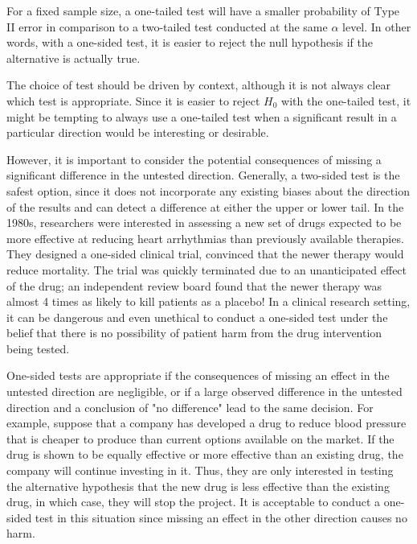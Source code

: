 
For a fixed sample size, a one-tailed test will have a smaller probability of Type II error in comparison to a two-tailed test conducted at the same $\alpha$ level. In other words, with a one-sided test, it is easier to reject the null hypothesis if the alternative is actually true. 

The choice of test should be driven by context, although it is not always clear which test is appropriate. Since it is easier to reject $H_0$ with the one-tailed test, it might be tempting to always use a one-tailed test when a significant result in a particular direction would be interesting or desirable. 

However, it is important to consider the potential consequences of missing a significant difference in the untested direction. Generally, a two-sided test is the safest option, since it does not incorporate any existing biases about the direction of the results and can detect a difference at either the upper or lower tail. In the 1980s, researchers were interested in assessing a new set of drugs expected to be more effective at reducing heart arrhythmias than previously available therapies. They designed a one-sided clinical trial, convinced that the newer therapy would reduce mortality. The trial was quickly terminated due to an unanticipated effect of the drug; an independent review board found that the newer therapy was almost 4 times as likely to kill patients as a placebo! In a clinical research setting, it can be dangerous and even unethical to conduct a one-sided test under the belief that there is no possibility of patient harm from the drug intervention being tested.


One-sided tests are appropriate if the consequences of missing an effect in the untested direction are negligible, or if a large observed difference in the untested direction and a conclusion of "no difference" lead to the same decision. For example, suppose that a company has developed a drug to reduce blood pressure that is cheaper to produce than current options available on the market. If the drug is shown to be equally effective or more effective than an existing drug, the company will continue investing in it. Thus, they are only interested in testing the alternative hypothesis that the new drug is less effective than the existing drug, in which case, they will stop the project. It is acceptable to conduct a one-sided test in this situation since missing an effect in the other direction causes no harm. 

